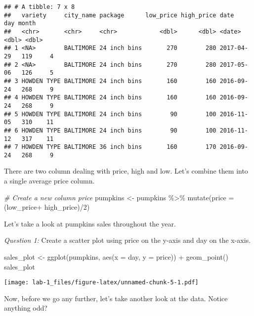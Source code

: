 \documentclass[
]{article}
\newenvironment{Shaded}{\begin{snugshade}}{\end{snugshade}}
\newcommand{\AttributeTok}[1]{\textcolor[rgb]{0.77,0.63,0.00}{#1}}
\newcommand{\CommentTok}[1]{\textcolor[rgb]{0.56,0.35,0.01}{\textit{#1}}}
\newcommand{\DecValTok}[1]{\textcolor[rgb]{0.00,0.00,0.81}{#1}}
\newcommand{\FunctionTok}[1]{\textcolor[rgb]{0.00,0.00,0.00}{#1}}
\newcommand{\NormalTok}[1]{#1}
\newcommand{\OtherTok}[1]{\textcolor[rgb]{0.56,0.35,0.01}{#1}}
\newcommand{\SpecialCharTok}[1]{\textcolor[rgb]{0.00,0.00,0.00}{#1}}
\begin{document}
\begin{verbatim}
## # A tibble: 7 x 8
##   variety     city_name package      low_price high_price date         day month
##   <chr>       <chr>     <chr>            <dbl>      <dbl> <date>     <dbl> <dbl>
## 1 <NA>        BALTIMORE 24 inch bins       270        280 2017-04-29   119     4
## 2 <NA>        BALTIMORE 24 inch bins       270        280 2017-05-06   126     5
## 3 HOWDEN TYPE BALTIMORE 24 inch bins       160        160 2016-09-24   268     9
## 4 HOWDEN TYPE BALTIMORE 24 inch bins       160        160 2016-09-24   268     9
## 5 HOWDEN TYPE BALTIMORE 24 inch bins        90        100 2016-11-05   310    11
## 6 HOWDEN TYPE BALTIMORE 24 inch bins        90        100 2016-11-12   317    11
## 7 HOWDEN TYPE BALTIMORE 36 inch bins       160        170 2016-09-24   268     9
\end{verbatim}

There are two column dealing with price, high and low. Let's combine
them into a single average price column.

\begin{Shaded}
\begin{Highlighting}[]
\CommentTok{\# Create a new column price}
\NormalTok{pumpkins }\OtherTok{\textless{}{-}}\NormalTok{ pumpkins }\SpecialCharTok{\%\textgreater{}\%} 
  \FunctionTok{mutate}\NormalTok{(}\AttributeTok{price =}\NormalTok{ (low\_price}\SpecialCharTok{+}\NormalTok{ high\_price)}\SpecialCharTok{/}\DecValTok{2}\NormalTok{)}
\end{Highlighting}
\end{Shaded}

Let's take a look at pumpkins sales throughout the year.

\emph{Question 1:} Create a scatter plot using price on the y-axis and
day on the x-axis.

\begin{Shaded}
\begin{Highlighting}[]
\NormalTok{sales\_plot }\OtherTok{\textless{}{-}} \FunctionTok{ggplot}\NormalTok{(pumpkins, }\FunctionTok{aes}\NormalTok{(}\AttributeTok{x =}\NormalTok{ day, }\AttributeTok{y =}\NormalTok{ price)) }\SpecialCharTok{+}
  \FunctionTok{geom\_point}\NormalTok{()}
\NormalTok{sales\_plot}
\end{Highlighting}
\end{Shaded}

\texttt{[image: lab-1\_files/figure-latex/unnamed-chunk-5-1.pdf]}

Now, before we go any further, let's take another look at the data.
Notice anything odd?
\end{document}

